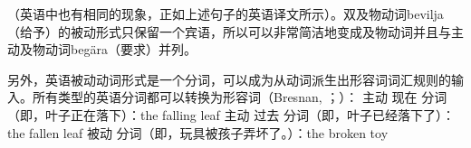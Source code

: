 \z
\noindent
（英语中也有相同的现象，正如上述句子的英语译文所示）。双及物动词bevilja（给予）的被动形式只保留一个宾语，所以可以非常简洁地变成及物动词并且与主动及物动词beg\"ara（要求）并列。

    另外，英语被动动词形式是一个分词，可以成为从动词派生出形容词词汇规则的输入。所有类型的英语分词都可以转换为形容词（Bresnan, \citeyear{Bresnan82a}；\citeyear[\S~3]{Bresnan2001a}）：
\eal
\ex 主动 现在 分词（即，叶子正在落下）：the falling leaf
\ex 主动 过去 分词（即，叶子已经落下了）：the fallen leaf
\ex 被动 分词（即，玩具被孩子弄坏了。）：the broken toy
\zl

